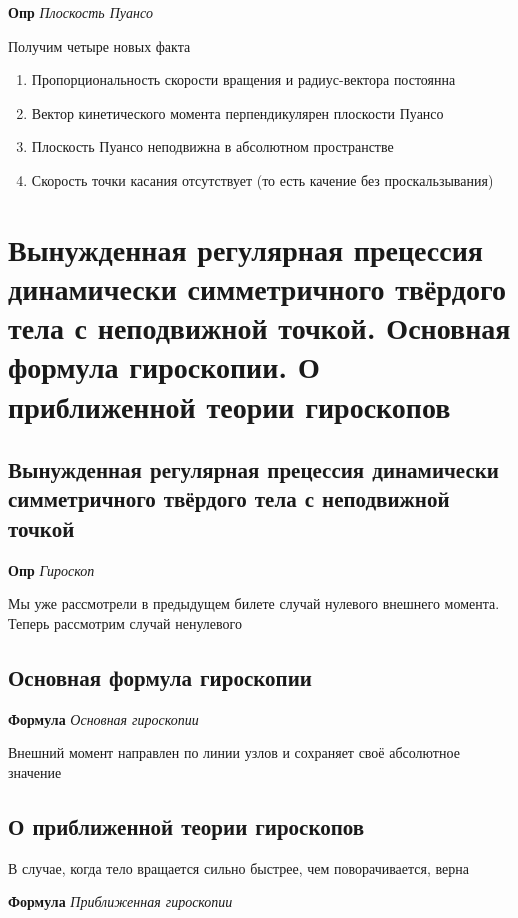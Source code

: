 \documentclass[a4paper, 14pt]{article}
\begin{document}
    \textbf{Опр} \textit{Плоскость Пуансо}
    
    Получим четыре новых факта
    
    \begin{enumerate}
        \item Пропорциональность скорости вращения и радиус-вектора постоянна
        \item Вектор кинетического момента перпендикулярен плоскости Пуансо
        \item Плоскость Пуансо неподвижна в абсолютном пространстве
        \item Скорость точки касания отсутствует (то есть качение без проскальзывания)
    \end{enumerate}
    
    \section{Вынужденная регулярная прецессия динамически симметричного твёрдого тела с неподвижной точкой.
    Основная формула гироскопии.
    О приближенной теории гироскопов}
    
    \subsection{Вынужденная регулярная прецессия динамически симметричного твёрдого тела с неподвижной точкой}
    
    \textbf{Опр} \textit{Гироскоп}
    
    Мы уже рассмотрели в предыдущем билете случай нулевого внешнего момента.
    Теперь рассмотрим случай ненулевого
    
    \subsection{Основная формула гироскопии}
    
    \textbf{Формула} \textit{Основная гироскопии}
    
    Внешний момент направлен по линии узлов и сохраняет своё абсолютное значение
    
    \subsection{О приближенной теории гироскопов}
    
    В случае, когда тело вращается сильно быстрее, чем поворачивается, верна
    
    \textbf{Формула} \textit{Приближенная гироскопии}
    
\end{document}
